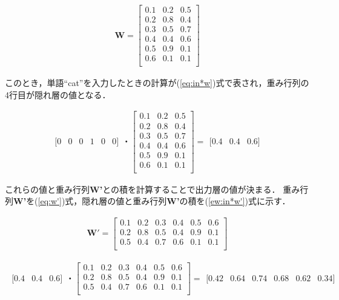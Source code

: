 \documentclass{thesis}
\begin{document}
\begin{align}
	\label{eq:w}
	\bm{W}=\left[
	\begin{array}{ccc}
		0.1 & 0.2 & 0.5 \\
		0.2 & 0.8 & 0.4 \\
		0.3 & 0.5 & 0.7 \\
		0.4 & 0.4 & 0.6 \\
		0.5 & 0.9 & 0.1 \\
		0.6 & 0.1 & 0.1 \\
	\end{array}
	\right]
\end{align}


このとき，単語``cat''を入力したときの計算が(\ref{eq:in*w})式で表され，重み行列の4行目が隠れ層の値となる．


\begin{align}
	\label{eq:in*w}
	\begin{array}{cccccc}
	[0 & 0 & 0 & 1 & 0 & 0]
	\end{array}
	・\left[
	\begin{array}{ccc}
		0.1 & 0.2 & 0.5 \\
		0.2 & 0.8 & 0.4 \\
		0.3 & 0.5 & 0.7 \\
		0.4 & 0.4 & 0.6 \\
		0.5 & 0.9 & 0.1 \\
		0.6 & 0.1 & 0.1 \\
	\end{array}
	\right]=
	\begin{array}{ccc}
	[0.4 & 0.4 & 0.6]
	\end{array}
\end{align}

これらの値と重み行列\textbf{W'}との積を計算することで出力層の値が決まる．
重み行列\textbf{W'}を(\ref{eq:w'})式，隠れ層の値と重み行列\textbf{W'}の積を(\ref{ew:in*w'})式に示す．


\begin{align}
	\label{eq:w'}
	\bm{W'}=\left[
	\begin{array}{cccccc}
		0.1 & 0.2 & 0.3 & 0.4 & 0.5 & 0.6 \\
		0.2 & 0.8 & 0.5 & 0.4 & 0.9 & 0.1 \\
		0.5 & 0.4 & 0.7 & 0.6 & 0.1 & 0.1 \\
	\end{array}
	\right]
\end{align}


\begin{align}
	\label{ew:in*w'}
	\begin{array}{ccc}
		[0.4 & 0.4 & 0.6]
	\end{array}
	・\left[
	\begin{array}{cccccc}
		0.1 & 0.2 & 0.3 & 0.4 & 0.5 & 0.6 \\
		0.2 & 0.8 & 0.5 & 0.4 & 0.9 & 0.1 \\
		0.5 & 0.4 & 0.7 & 0.6 & 0.1 & 0.1 \\
	\end{array}
	\right]=
	\begin{array}{cccccc}
		[0.42 & 0.64 & 0.74 & 0.68 & 0.62 & 0.34]
	\end{array}
\end{align}
\end{document}
